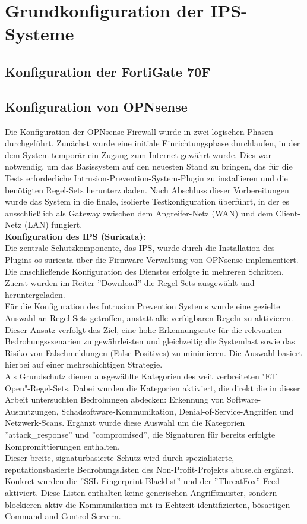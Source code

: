 \section{Grundkonfiguration der IPS-Systeme}
\subsection{Konfiguration der FortiGate 70F}
\subsection{Konfiguration von OPNsense}

Die Konfiguration der OPNsense-Firewall wurde in zwei logischen Phasen durchgeführt. Zunächst wurde eine initiale Einrichtungsphase durchlaufen, in der dem System temporär ein Zugang zum Internet gewährt wurde. Dies war notwendig, um das Basissystem auf den neuesten Stand zu bringen, das für die Tests erforderliche Intrusion-Prevention-System-Plugin zu installieren und die benötigten Regel-Sets herunterzuladen. Nach Abschluss dieser Vorbereitungen wurde das System in die finale, isolierte Testkonfiguration überführt, in der es ausschließlich als Gateway zwischen dem Angreifer-Netz (WAN) und dem Client-Netz (LAN) fungiert.\\

\textbf{Konfiguration des IPS (Suricata):}\\
Die zentrale Schutzkomponente, das IPS, wurde durch die Installation des Plugins os-suricata über die Firmware-Verwaltung von OPNsense implementiert. Die anschließende Konfiguration des Dienstes erfolgte in mehreren Schritten. Zuerst wurden im Reiter ''Download'' die Regel-Sets ausgewählt und heruntergeladen.\\

Für die Konfiguration des Intrusion Prevention Systems wurde eine gezielte Auswahl an Regel-Sets getroffen, anstatt alle verfügbaren Regeln zu aktivieren. Dieser Ansatz verfolgt das Ziel, eine hohe Erkennungsrate für die relevanten Bedrohungsszenarien zu gewährleisten und gleichzeitig die Systemlast sowie das Risiko von Falschmeldungen (False-Positives) zu minimieren. Die Auswahl basiert hierbei auf einer mehrschichtigen Strategie.\\
Als Grundschutz dienen ausgewählte Kategorien des weit verbreiteten "ET Open"-Regel-Sets. Dabei wurden die Kategorien aktiviert, die direkt die in dieser Arbeit untersuchten Bedrohungen abdecken: Erkennung von Software-Ausnutzungen, Schadsoftware-Kommunikation, Denial-of-Service-Angriffen und Netzwerk-Scans. Ergänzt wurde diese Auswahl um die Kategorien ''attack\_response'' und ''compromised'', die Signaturen für bereits erfolgte Kompromittierungen enthalten.\\
Dieser breite, signaturbasierte Schutz wird durch spezialisierte, reputationsbasierte Bedrohungslisten des Non-Profit-Projekts abuse.ch ergänzt. Konkret wurden die ''SSL Fingerprint Blacklist'' und der ''ThreatFox''-Feed aktiviert. Diese Listen enthalten keine generischen Angriffsmuster, sondern blockieren aktiv die Kommunikation mit in Echtzeit identifizierten, bösartigen Command-and-Control-Servern.







